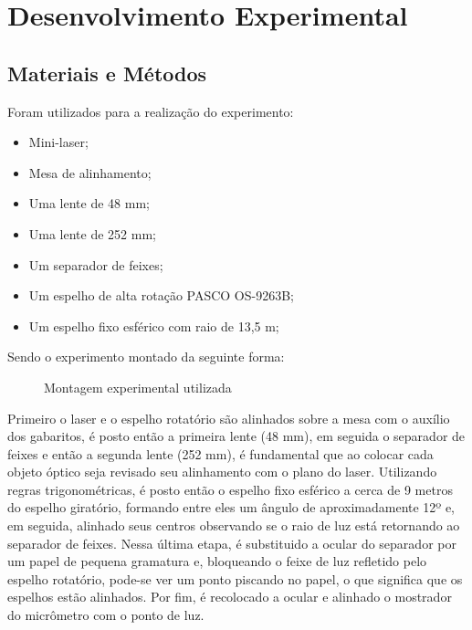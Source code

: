 \section{Desenvolvimento Experimental}
\subsection{Materiais e Métodos}
Foram utilizados para a realização do experimento:
\begin{itemize}
	\item Mini-laser;
	\item Mesa de alinhamento;
	\item Uma lente de 48 mm;
	\item Uma lente de 252 mm;
	\item Um separador de feixes;
	\item Um espelho de alta rotação PASCO OS-9263B;
	\item Um espelho fixo esférico com raio de 13,5 m;
\end{itemize}
Sendo o experimento montado da seguinte forma:
\begin{figure}[h!]
	\centering
	\caption{Montagem experimental utilizada}
\end{figure}


Primeiro o laser e o espelho rotatório são alinhados sobre a mesa com o auxílio dos gabaritos, é posto então a primeira lente (48 mm), em seguida o separador de feixes e então a segunda lente (252 mm), é fundamental que ao colocar cada objeto óptico seja revisado seu alinhamento com o plano do laser. Utilizando regras trigonométricas, é posto então o espelho fixo esférico a cerca de 9 metros
do espelho giratório, formando entre eles um ângulo de aproximadamente 12º e, em seguida, alinhado seus centros observando  se o raio de luz está retornando ao separador de feixes. Nessa última etapa, é substituido a ocular do separador por um papel de pequena gramatura e, bloqueando o feixe de luz refletido pelo espelho rotatório, pode-se ver um ponto piscando no papel, o que significa que os espelhos estão alinhados. Por fim, é recolocado a ocular e alinhado o mostrador do micrômetro com o ponto de luz.
